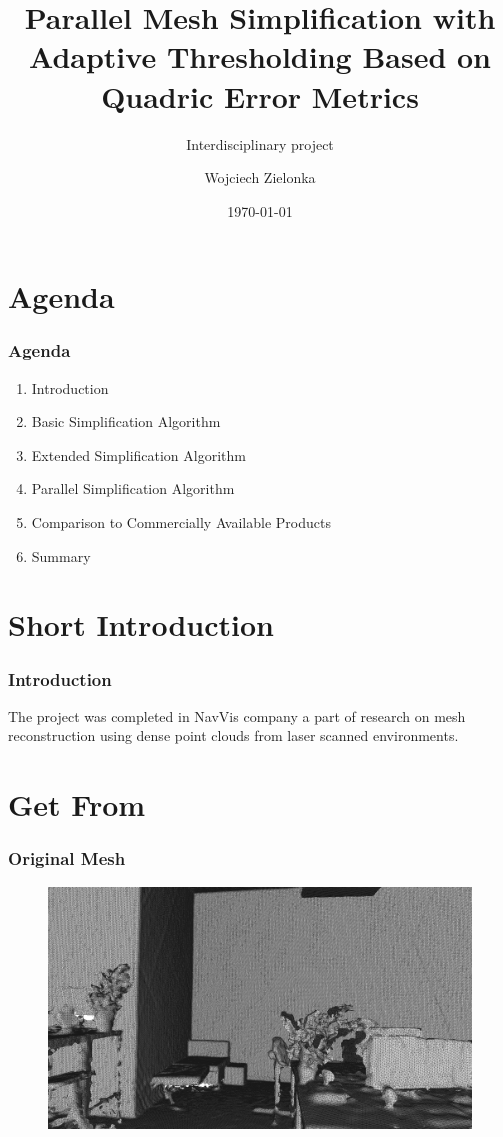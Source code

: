 \documentclass[
	10pt,
	t		%
]{beamer}
\title{Parallel Mesh Simplification with Adaptive Thresholding Based on Quadric Error Metrics}
\subtitle{Interdisciplinary project}
\author{Wojciech Zielonka}
\date{\today}
\begin{document}
\AddToShipoutPicture{\TitlePicture}
\maketitle
\ClearShipoutPicture
\AddToShipoutPicture{\BackgroundPicture}

\section{Agenda}
\centering
\begin{frame}
\frametitle{Agenda}
\begin{enumerate}
\item Introduction
\item Basic Simplification Algorithm
\item Extended Simplification Algorithm
\item Parallel Simplification Algorithm
\item Comparison to Commercially Available Products
\item Summary
\end{enumerate}
\end{frame}

\section{Short Introduction}
\centering
\begin{frame}
\frametitle{Introduction}
\begin{center}
The project was completed in NavVis company a part of research on mesh reconstruction using dense point clouds from laser scanned environments.
\end{center}
\end{frame}

\section{Get From}
\begin{frame}
\frametitle{Original Mesh}
\begin{figure}[ht]
	\centering
    \includegraphics[width=1\textwidth]{from}
\end{figure}
\end{frame}
\end{document}
